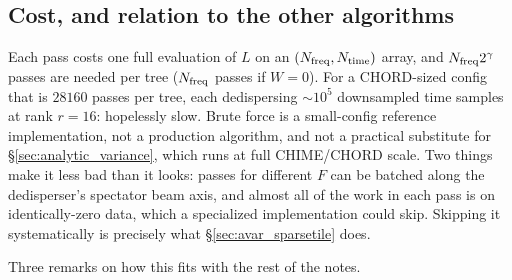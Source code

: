 \documentclass{article}
\numberwithin{equation}{section}   %
\begin{document}
\subsection{Cost, and relation to the other algorithms}

Each pass costs one full evaluation of $L$ on an $(N_{\rm freq}, N_{\rm time})$ array, and
$N_{\rm freq} 2^\gamma$ passes are needed per tree ($N_{\rm freq}$ passes if $W=0$). For a
CHORD-sized config that is $28160$ passes per tree, each dedispersing $\sim\!10^5$ downsampled time
samples at rank $r=16$: hopelessly slow. Brute force is a small-config reference implementation,
not a production algorithm, and not a practical substitute for \S\ref{sec:analytic_variance},
which runs at full CHIME/CHORD scale. Two things make it less bad than it looks: passes for different $F$ can be batched along the
dedisperser's spectator beam axis, and almost all of the work in each pass is on identically-zero
data, which a specialized implementation could skip. Skipping it systematically is precisely what
\S\ref{sec:avar_sparsetile} does.

Three remarks on how this fits with the rest of the notes.
\end{document}
